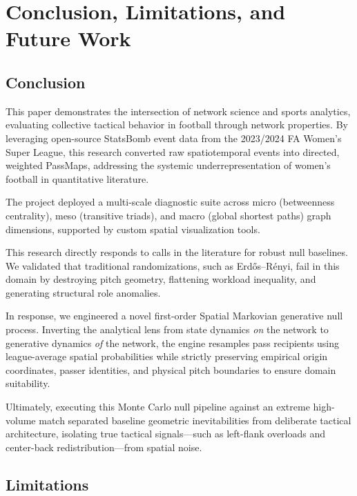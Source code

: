 \documentclass[12pt, a4paper]{article}
\begin{document}
\clearpage
\section{Conclusion, Limitations, and Future Work}
\label{sec:conclusion_limitations_future}

\subsection{Conclusion}
\label{subsec:conclusion}

This paper demonstrates the intersection of network science and sports analytics, evaluating collective tactical behavior in football through network properties. By leveraging open-source StatsBomb event data from the 2023/2024 FA Women's Super League, this research converted raw spatiotemporal events into directed, weighted PassMaps, addressing the systemic underrepresentation of women's football in quantitative literature.

The project deployed a multi-scale diagnostic suite across micro (betweenness centrality), meso (transitive triads), and macro (global shortest paths) graph dimensions, supported by custom spatial visualization tools.

This research directly responds to calls in the literature \cite{gama2026stoch} for robust null baselines. We validated that traditional randomizations, such as Erd{\H{o}}s--R{\'e}nyi, fail in this domain by destroying pitch geometry, flattening workload inequality, and generating structural role anomalies.

In response, we engineered a novel first-order Spatial Markovian generative null process. Inverting the analytical lens from state dynamics \textit{on} the network to generative dynamics \textit{of} the network, the engine resamples pass recipients using league-average spatial probabilities while strictly preserving empirical origin coordinates, passer identities, and physical pitch boundaries to ensure domain suitability.

Ultimately, executing this Monte Carlo null pipeline against an extreme high-volume match separated baseline geometric inevitabilities from deliberate tactical architecture, isolating true tactical signals—such as left-flank overloads and center-back redistribution—from spatial noise.

\subsection{Limitations}
\label{subsec:limitations}
\end{document}
